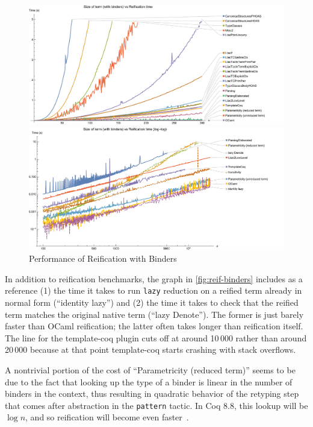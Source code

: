 \begin{figure}[t]
\noindent \includegraphics[width=\textwidth]{reification-by-parametricity/actual-reif-with-binders.pdf}

\noindent \includegraphics[width=\textwidth]{reification-by-parametricity/actual-reif-with-binders-log-log-subset.pdf}
\caption{Performance of Reification with Binders}\label{fig:reif-binders}
\end{figure}

In addition to reification benchmarks, the graph in \autoref{fig:reif-binders} includes as a reference (1) the time it takes to run \texttt{lazy} reduction on a reified term already in normal form (``identity lazy'') and (2) the time it takes to check that the reified term matches the original native term (``lazy Denote'').
The former is just barely faster than OCaml reification; the latter often takes longer than reification itself.
The line for the template-coq plugin cuts off at around 10\,000 rather than around 20\,000 because at that point template-coq starts crashing with stack overflows.

A nontrivial portion of the cost of ``Parametricity (reduced term)'' seems to be due to the fact that looking up the type of a binder is linear in the number of binders in the context, thus resulting in quadratic behavior of the retyping step that comes after abstraction in the \texttt{pattern} tactic.
In Coq 8.8, this lookup will be $\log n$, and so reification will become even faster~\cite{coq-pr-fast-rel-lookup}.

